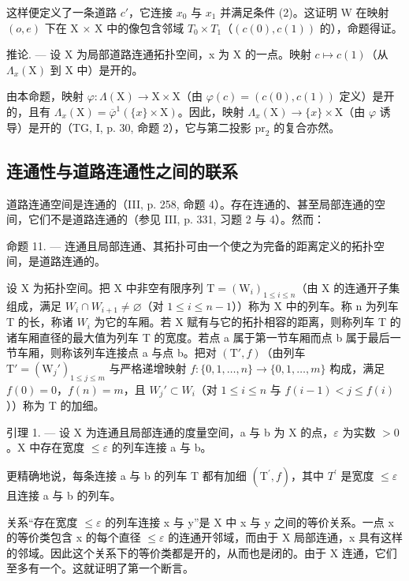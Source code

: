 这样便定义了一条道路 \(c'\)，它连接 \(x_{0}\) 与 \(x_{1}\) 并满足条件 (2)。这证明 W 在映射 \((o, e)\) 下在 X × X 中的像包含邻域 \(T_{0} \times T_{1}\)（\((c(0), c(1))\) 的），命题得证。

推论. --- 设 X 为局部道路连通拓扑空间，x 为 X 的一点。映射 \(c \mapsto c(1)\)（从 \(\Lambda_{x}(\mathrm{X})\) 到 X 中）是开的。

由本命题，映射 \(\varphi\colon\Lambda(\mathrm{X})\to\mathrm{X}\times\mathrm{X}\)（由 \(\varphi(c)=(c(0),c(1))\) 定义）是开的，且有 \(\Lambda_{x}(\mathrm{X})=\overline{\varphi}^{1}(\{x\}\times\mathrm{X})\)。因此，映射 \(\Lambda_{x}(\mathrm{X})\to\{x\}\times\mathrm{X}\)（由 \(\varphi\) 诱导）是开的（TG, I, p. 30, 命题 2），它与第二投影 \(\mathrm{pr}_{2}\) 的复合亦然。

\subsection{连通性与道路连通性之间的联系}

道路连通空间是连通的（III, p. 258, 命题 4）。存在连通的、甚至局部连通的空间，它们不是道路连通的（参见 III, p. 331, 习题 2 与 4）。然而：

命题 11. --- 连通且局部连通、其拓扑可由一个使之为完备的距离定义的拓扑空间，是道路连通的。

设 X 为拓扑空间。把 X 中非空有限序列 \(\mathrm{T} = (\mathrm{W}_{i})_{1 \leqslant i \leqslant n}\)（由 X 的连通开子集组成，满足 \(W_{i} \cap W_{i+1} \neq \varnothing\)（对 \(1 \leqslant i \leqslant n-1\)））称为 X 中的列车。称 n 为列车 T 的长，称诸 \(W_{i}\) 为它的车厢。若 X 赋有与它的拓扑相容的距离，则称列车 T 的诸车厢直径的最大值为列车 T 的宽度。若点 a 属于第一节车厢而点 b 属于最后一节车厢，则称该列车连接点 a 与点 b。把对 \((\mathrm{T}', f)\)（由列车 \(\mathrm{T}' = (\mathrm{W}_{j}')_{1 \leqslant j \leqslant m}\) 与严格递增映射 \(f: \{0, 1, \ldots, n\} \to \{0, 1, \ldots, m\}\) 构成，满足 \(f(0) = 0\)，\(f(n) = m\)，且 \(W_{j}' \subset W_{i}\)（对 \(1 \leqslant i \leqslant n\) 与 \(f(i-1) < j \leqslant f(i)\)））称为 T 的加细。

引理 1. --- 设 X 为连通且局部连通的度量空间，a 与 b 为 X 的点，\(\varepsilon\) 为实数 \(>0\)。X 中存在宽度 \(\leqslant \varepsilon\) 的列车连接 a 与 b。

更精确地说，每条连接 a 与 b 的列车 T 都有加细 \((\mathrm{T}^{\prime}, f)\)，其中 \(T^{\prime}\) 是宽度 \(\leqslant\varepsilon\) 且连接 a 与 b 的列车。

关系“存在宽度 \(\leqslant\varepsilon\) 的列车连接 x 与 y”是 X 中 x 与 y 之间的等价关系。一点 x 的等价类包含 x 的每个直径 \(\leqslant\varepsilon\) 的连通开邻域，而由于 X 局部连通，x 具有这样的邻域。因此这个关系下的等价类都是开的，从而也是闭的。由于 X 连通，它们至多有一个。这就证明了第一个断言。

